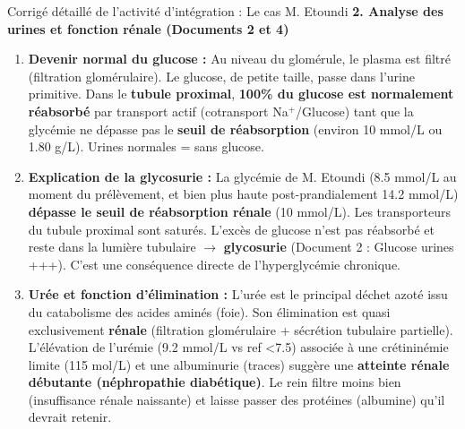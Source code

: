 \documentclass[11pt]{article}
\begin{document}
\begin{exoresolu}{Corrigé détaillé de l'activité d'intégration : Le cas M. Etoundi}
\textbf{2. Analyse des urines et fonction rénale (Documents 2 et 4)}
\begin{enumerate}
    \item \textbf{Devenir normal du glucose :} Au niveau du glomérule, le plasma est filtré (filtration glomérulaire). Le glucose, de petite taille, passe dans l'urine primitive. Dans le \textbf{tubule proximal}, \textbf{100\% du glucose est normalement réabsorbé} par transport actif (cotransport Na$^+$/Glucose) tant que la glycémie ne dépasse pas le \textbf{seuil de réabsorption} (environ \num{10} mmol/L ou \num{1,80} g/L). Urines normales = sans glucose.
    \item \textbf{Explication de la glycosurie :} La glycémie de M. Etoundi (\num{8,5} mmol/L au moment du prélèvement, et bien plus haute post-prandialement \num{14,2} mmol/L) \textbf{dépasse le seuil de réabsorption rénale} (\num{10} mmol/L). Les transporteurs du tubule proximal sont saturés. L'excès de glucose n'est pas réabsorbé et reste dans la lumière tubulaire $\to$ \textbf{glycosurie} (Document 2 : Glucose urines +++). C'est une conséquence directe de l'hyperglycémie chronique.
    \item \textbf{Urée et fonction d'élimination :} L'urée est le principal déchet azoté issu du catabolisme des acides aminés (foie). Son élimination est quasi exclusivement \textbf{rénale} (filtration glomérulaire + sécrétion tubulaire partielle). L'élévation de l'urémie (\num{9,2} mmol/L vs ref \textless \num{7,5}) associée à une crétininémie limite (\num{115} \textmu mol/L) et une albuminurie (traces) suggère une \textbf{atteinte rénale débutante (néphropathie diabétique)}. Le rein filtre moins bien (insuffisance rénale naissante) et laisse passer des protéines (albumine) qu'il devrait retenir.
\end{enumerate}


\end{exoresolu}
\end{document}
